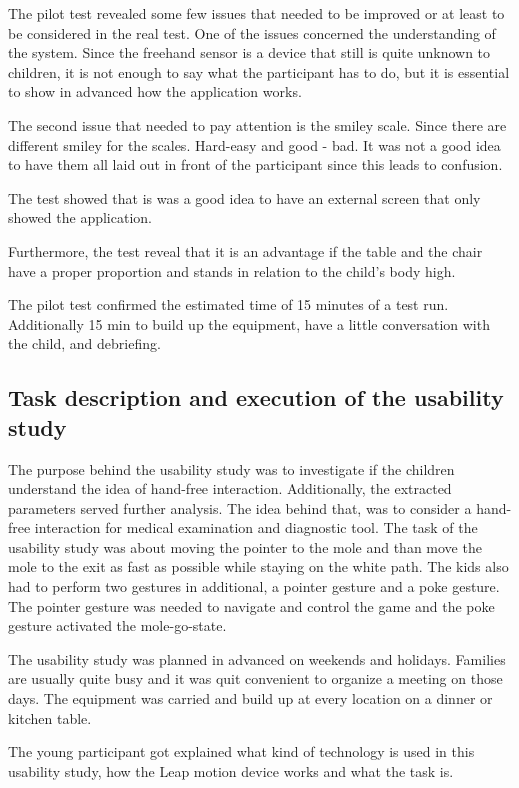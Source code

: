 The pilot test revealed some few issues that needed to be improved or at least to be considered in the real test.  One of the issues concerned the understanding of the system. Since the freehand sensor is a device that still is quite unknown to children,  it is  not enough to say what the participant has to do, but it is  essential to show in advanced how the application works.

The second issue that needed to pay attention is the smiley scale. Since there are different smiley for the scales. Hard-easy and good - bad. It was not a good idea to have them all laid out in front of the participant since this leads to confusion.

The test showed that is was a good idea to have an external screen that only showed the application. 

Furthermore, the test reveal that it is an advantage if the table and the chair have a proper proportion and stands  in relation to the child's body high.

 
The pilot test confirmed the estimated time of 15 minutes of a test run. Additionally 15 min to build up the equipment, have a little conversation with the child, and debriefing.

\subsection{Task description and execution of the usability study}

The purpose behind the usability study was to investigate if the children understand the idea of hand-free interaction. Additionally, the extracted parameters served further analysis. The idea behind that, was to consider a hand-free interaction for medical examination and diagnostic tool. The task of the usability study was about moving the pointer to the mole and than move the mole to the exit as fast as possible while staying on the white path.
The kids also had to perform two gestures in additional, a pointer gesture and a poke gesture. The pointer gesture was needed to navigate and control the game and the poke gesture activated the mole-go-state.

The usability study was planned in advanced on weekends and holidays. Families are usually quite busy and it was quit convenient to organize a meeting on those days.
The equipment was carried and build up at every location on a dinner or kitchen table.

The young participant got explained what kind of technology is used in this usability study, how the Leap motion device works and what the task is.

